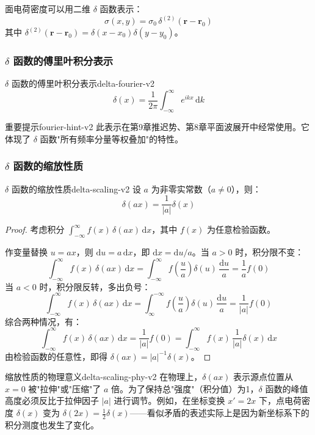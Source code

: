 \documentclass[11pt,a4paper,openany,oneside]{book}
\newcommand{\diff}{\mathrm{d}}
\newcommand{\vect}[1]{\bm{#1}}
\begin{document}
面电荷密度可以用二维 $\delta$ 函数表示：
\[
\sigma(x, y) = \sigma_0 \, \delta^{(2)}(\vect{r} - \vect{r}_0)
\]
其中 $\delta^{(2)}(\vect{r} - \vect{r}_0) = \delta(x - x_0)\delta(y - y_0)$。

\subsubsection{$\delta$ 函数的傅里叶积分表示}

\begin{theorem}{$\delta$ 函数的傅里叶积分表示}{delta-fourier-v2}
\[
\delta(x) = \frac{1}{2\pi} \int_{-\infty}^{\infty} e^{ikx} \, \diff k
\]
\end{theorem}

\begin{tip}{重要提示}{fourier-hint-v2}
此表示在第9章推迟势、第8章平面波展开中经常使用。它体现了 $\delta$ 函数"所有频率分量等权叠加"的特性。
\end{tip}

\subsubsection{$\delta$ 函数的缩放性质}

\begin{theorem}{$\delta$ 函数的缩放性质}{delta-scaling-v2}
设 $a$ 为非零实常数（$a \neq 0$），则：
\[
\delta(ax) = \frac{1}{|a|}\delta(x)
\]
\end{theorem}

\begin{proof}
考虑积分 $\displaystyle\int_{-\infty}^{\infty} f(x)\,\delta(ax)\,\diff x$，其中 $f(x)$ 为任意检验函数。

作变量替换 $u = ax$，则 $\diff u = a\,\diff x$，即 $\diff x = \diff u/a$。当 $a > 0$ 时，积分限不变：
\[
\int_{-\infty}^{\infty} f(x)\,\delta(ax)\,\diff x = \int_{-\infty}^{\infty} f\!\left(\frac{u}{a}\right)\delta(u)\,\frac{\diff u}{a} = \frac{1}{a} f(0)
\]
当 $a < 0$ 时，积分限反转，多出负号：
\[
\int_{-\infty}^{\infty} f(x)\,\delta(ax)\,\diff x = \int_{\infty}^{-\infty} f\!\left(\frac{u}{a}\right)\delta(u)\,\frac{\diff u}{a} = \frac{1}{|a|} f(0)
\]
综合两种情况，有：
\[
\int_{-\infty}^{\infty} f(x)\,\delta(ax)\,\diff x = \frac{1}{|a|} f(0) = \int_{-\infty}^{\infty} f(x)\,\frac{1}{|a|}\delta(x)\,\diff x
\]
由检验函数的任意性，即得 $\delta(ax) = |a|^{-1}\delta(x)$。
\end{proof}

\begin{insight}{缩放性质的物理意义}{delta-scaling-phy-v2}
在物理上，$\delta(ax)$ 表示源点位置从 $x=0$ 被"拉伸"或"压缩"了 $a$ 倍。为了保持总"强度"（积分值）为1，$\delta$ 函数的峰值高度必须反比于拉伸因子 $|a|$ 进行调节。例如，在坐标变换 $x' = 2x$ 下，点电荷密度 $\delta(x)$ 变为 $\delta(2x) = \frac{1}{2}\delta(x)$——看似矛盾的表述实际上是因为新坐标系下的积分测度也发生了变化。
\end{insight}
\end{document}
